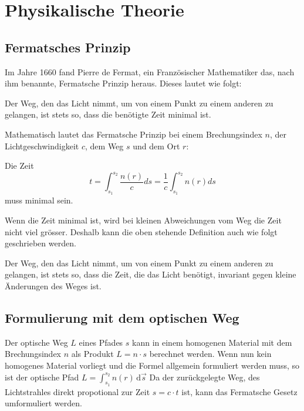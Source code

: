 \section{Physikalische Theorie}

\subsection{Fermatsches Prinzip}
Im Jahre 1660 fand Pierre de Fermat, 
ein Französischer Mathematiker das, 
nach ihm benannte, Fermatsche Prinzip heraus. 
Dieses lautet wie folgt:


Der Weg, den das Licht nimmt, 
um von einem Punkt zu einem anderen zu gelangen, 
ist stets so, dass die benötigte Zeit minimal ist.


Mathematisch lautet das Fermatsche Prinzip bei einem Brechungsindex $n$, 
der Lichtgeschwindigkeit $c$, dem Weg $s$ und dem Ort $r$: 

Die Zeit
\[
t= \int_{s_1}^{s_2} \frac{n(r)}{c} ds =
\frac{1}{c} \int_{s_1}^{s_2} n(r) ds
\]
muss minimal sein.

Wenn die Zeit minimal ist, 
wird bei kleinen Abweichungen vom Weg die Zeit nicht viel grösser. 
Deshalb kann die oben stehende Definition auch wie folgt geschrieben werden.

Der Weg, den das Licht nimmt, 
um von einem Punkt zu einem anderen zu gelangen, 
ist stets so, dass die Zeit, die das Licht benötigt, 
invariant gegen kleine Änderungen des Weges ist.

\subsection{Formulierung mit dem optischen Weg}
Der optische Weg $L$  eines Pfades $s$ kann in einem homogenen Material 
mit dem Brechungsindex $n$ als Produkt $L = n \cdot s$ berechnet werden.
Wenn nun kein homogenes Material vorliegt und die Formel allgemein 
formuliert werden muss, so ist der optische Pfad $L = \int_{s_1}^{s_2} n(r) \,\mathrm d \vec s$
Da der zurückgelegte Weg, des Lichtstrahles direkt propotional zur Zeit $s = c \cdot t$ ist,
kann das Fermatsche Gesetz umformuliert werden.

